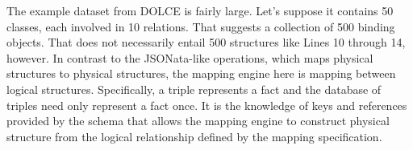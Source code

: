 \documentclass[10pt,letterpaper]{article} %
\begin{document}
The example dataset from DOLCE is fairly large.
Let's suppose it contains 50 classes, each involved in 10 relations.
That suggests a collection of 500 binding objects.
That does not necessarily entail 500 structures like Lines 10 through 14, however.
In contrast to the JSONata-like operations, which maps physical structures to physical structures,
the mapping engine here is mapping between logical structures.
Specifically, a triple represents a fact and the database of triples need only represent a fact once.
It is the knowledge of keys and references provided by the schema that allows the mapping engine to construct physical structure
from the logical relationship defined by the mapping specification.



\end{document}
